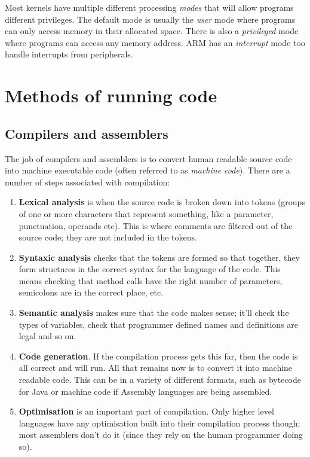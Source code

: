 Most kernels have multiple different processing {\it modes} that will allow
programs different privileges. The default mode is usually the {\it user} mode
where programs can only access memory in their allocated space. There is also a
{\it privileged} mode where programs can access any memory address. ARM has an
{\it interrupt} mode too handle interrupts from peripherals.

\section{Methods of running code}

\subsection{Compilers and assemblers}

The job of compilers and assemblers is to convert human readable source code
into machine executable code (often referred to as {\it machine code}). There
are a number of steps associated with compilation:

\begin{enumerate}

	\item {\bf Lexical analysis} is when the source code is broken down into
	tokens (groups of one or more characters that represent something, like a
	parameter, punctuation, operands etc). This is where comments are filtered
	out of the source code; they are not included in the tokens.

	\item {\bf Syntaxic analysis} checks that the tokens are formed so that
	together, they form structures in the correct syntax for the language of
	the code. This means checking that method calls have the right number of
	parameters, semicolons are in the correct place, etc.

	\item {\bf Semantic analysis} makes sure that the code makes sense; it'll
	check the types of variables, check that programmer defined names and
	definitions are legal and so on.

	\item {\bf Code generation}. If the compilation process gets this far, then
	the code is all correct and will run. All that remains now is to convert it
	into machine readable code. This can be in a variety of different formats,
	such as bytecode for Java or machine code if Assembly languages are being
	assembled.

	\item {\bf Optimisation} is an important part of compilation. Only higher
	level languages have any optimisation built into their compilation process
	though; most assemblers don't do it (since they rely on the human
	programmer doing so).

\end{enumerate}

